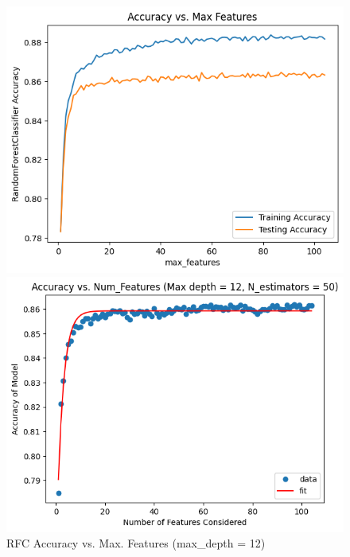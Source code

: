\documentclass[12pt, letterpaper]{article}
\begin{document}
\begin{figure}[ht]
    \centering
    \begin{minipage}{0.5\textwidth}
        \centering
        \includegraphics[width=\textwidth]{rf/rf8.png} %
    \end{minipage}\hfill
    \begin{minipage}{0.5\textwidth}
        \centering
        \includegraphics[width=\textwidth]{rf/rf9.png} %
    \end{minipage}
    \caption{RFC Accuracy vs. Max. Features (max\_depth = 12)}
    \label{fig:rf5}
\end{figure}
\end{document}
